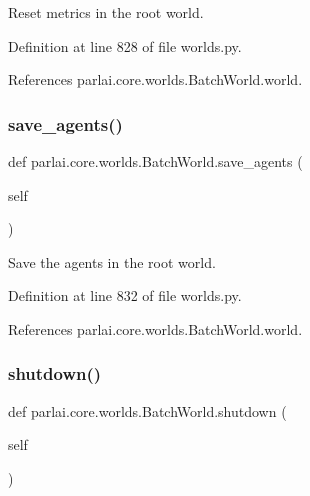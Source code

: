 \begin{DoxyVerb}Reset metrics in the root world.\end{DoxyVerb}
 

Definition at line 828 of file worlds.\+py.



References parlai.\+core.\+worlds.\+Batch\+World.\+world.

\mbox{\label{classparlai_1_1core_1_1worlds_1_1BatchWorld_a84ee0ac53e07cbfc9bdb8a978a8df7e1}} 
\subsubsection{\texorpdfstring{save\+\_\+agents()}{save\_agents()}}
{\footnotesize\ttfamily def parlai.\+core.\+worlds.\+Batch\+World.\+save\+\_\+agents (\begin{DoxyParamCaption}\item[{}]{self }\end{DoxyParamCaption})}

\begin{DoxyVerb}Save the agents in the root world.\end{DoxyVerb}
 

Definition at line 832 of file worlds.\+py.



References parlai.\+core.\+worlds.\+Batch\+World.\+world.

\mbox{\label{classparlai_1_1core_1_1worlds_1_1BatchWorld_ad351080076e31498e14789beddf6fea6}} 
\subsubsection{\texorpdfstring{shutdown()}{shutdown()}}
{\footnotesize\ttfamily def parlai.\+core.\+worlds.\+Batch\+World.\+shutdown (\begin{DoxyParamCaption}\item[{}]{self }\end{DoxyParamCaption})}

